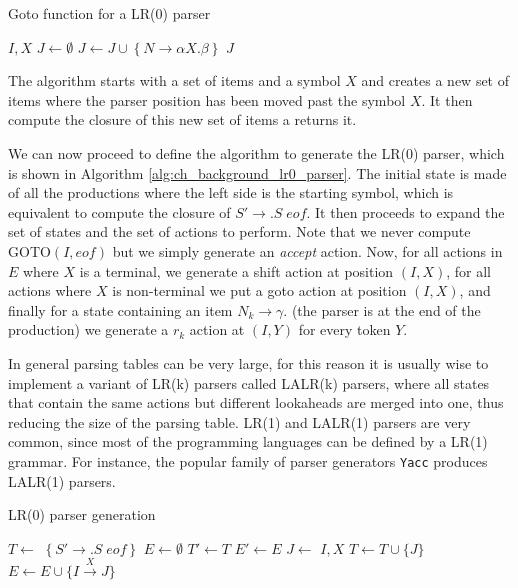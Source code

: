 \begin{algorithm}
	\caption{Goto function for a LR(0) parser}
	\label{alg:ch_background_parser_goto}
	\begin{algorithmic}
		 {$I, X$}
			\State $J \gets \emptyset$
				\State $J \gets J \cup \left\lbrace N \rightarrow \alpha X.\beta \right\rbrace$
			\EndFor
			\State \Return {} {$J$}
		\EndFunction
	\end{algorithmic}
\end{algorithm}

The algorithm starts with a set of items and a symbol $X$ and creates a new set of items where the parser position has been moved past the symbol $X$. It then compute the closure of this new set of items a returns it.

We can now proceed to define the algorithm to generate the LR(0) parser, which is shown in Algorithm \ref{alg:ch_background_lr0_parser}. The initial state is made of all the productions where the left side is the starting symbol, which is equivalent to compute the closure of $S' \rightarrow .S \; eof$. It then proceeds to expand the set of states and the set of actions to perform. Note that we never compute GOTO$(I,eof)$ but we simply generate an \textit{accept} action. Now, for all actions in $E$ where $X$ is a terminal, we generate a shift action at position $(I,X)$, for all actions where $X$ is non-terminal we put a goto action at position $(I,X)$, and finally for a state containing an item $N_{k} \rightarrow \gamma.$ (the parser is at the end of the production) we generate a $r_{k}$ action at $(I,Y)$ for every token $Y$. 

In general parsing tables can be very large, for this reason it is usually wise to implement a variant of LR(k) parsers called LALR(k) parsers, where all states that contain the same actions but different lookaheads are merged into one, thus reducing the size of the parsing table. LR(1) and LALR(1) parsers are very common, since most of the programming languages can be defined by a LR(1) grammar. For instance, the popular family of parser generators \texttt{Yacc} produces LALR(1) parsers.

\begin{algorithm}
	\caption{LR(0) parser generation}
	\label{alg:ch_background_lr0_parser}
	\begin{algorithmic}
		\State $T \gets $  {$\left\lbrace S' \rightarrow .S \; eof \right\rbrace$}
		\State $E \gets \emptyset$
		\Repeat
			\State $T' \gets T$
			\State $E' \gets E$
			\ForAll {$I \in T$}
				\ForAll {$N \rightarrow \alpha.X\beta \; \in I$}
					\State $J \gets $ \Call {Goto} {$I,X$}
					\State $T \gets T \cup \lbrace J \rbrace$
					\State $E \gets E \cup \lbrace I \xrightarrow{X} J \rbrace$
				\EndFor
			\EndFor
		\Until {$E' = E \text{\textbf{ and }} T' = T$}
	\end{algorithmic}
\end{algorithm}

